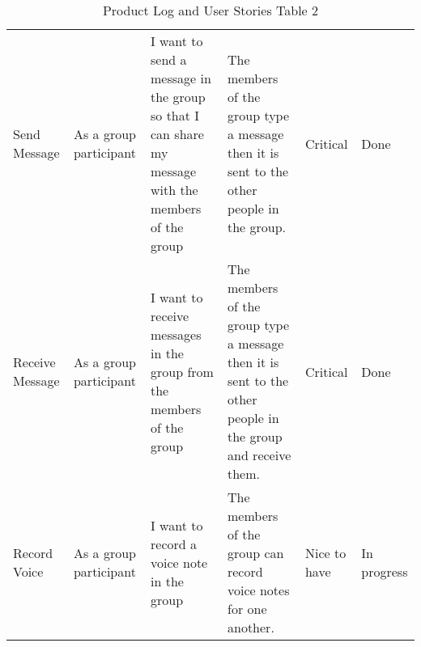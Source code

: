 \documentclass[a4paper]{article}
\begin{document}
\begin{table}
\begin{tabular}{p{1.5cm} p{2.5cm} p{3cm} p{3cm} p{1cm} p{1cm}}
Send Message & As a group participant & I want to send a message in the group so that I can share my message with the members of the group & The members of the group type a message then it is sent to the other people in the group. & Critical & Done\\ \cmidrule(l){2-6} %

Receive Message & As a group participant & I want to receive messages in the group from the members of the group & The members of the group type a message then it is sent to the other people in the group and receive them. & Critical & Done\\ \cmidrule(l){2-6} %

Record Voice & As a group participant & I want to record a voice note in the group & The members of the group can record voice notes for one another. & Nice to have & In progress\\ %

\midrule %
\midrule %
\end{tabular}
\caption{Product Log and User Stories Table 2} %
\label{tab:template} %
\end{table}
\end{document}
